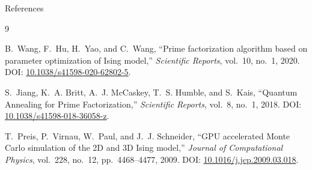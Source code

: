 \documentclass[9pt]{beamer}
\begin{document}
\begin{frame}{References}
\small
\begin{thebibliography}{9}

B.~Wang, F.~Hu, H.~Yao, and C.~Wang,
``Prime factorization algorithm based on parameter optimization of Ising model,''
\emph{Scientific Reports}, vol.~10, no.~1, 2020.
DOI: \href{https://doi.org/10.1038/s41598-020-62802-5}{10.1038/s41598-020-62802-5}.

S.~Jiang, K.~A. Britt, A.~J. McCaskey, T.~S. Humble, and S.~Kais,
``Quantum Annealing for Prime Factorization,''
\emph{Scientific Reports}, vol.~8, no.~1, 2018.
DOI: \href{https://doi.org/10.1038/s41598-018-36058-z}{10.1038/s41598-018-36058-z}.

T.~Preis, P.~Virnau, W.~Paul, and J.~J. Schneider,
``GPU accelerated Monte Carlo simulation of the 2D and 3D Ising model,''
\emph{Journal of Computational Physics}, vol.~228, no.~12, pp.~4468--4477, 2009.
DOI: \href{https://doi.org/10.1016/j.jcp.2009.03.018}{10.1016/j.jcp.2009.03.018}.

\end{thebibliography}

\end{frame}
\end{document}
